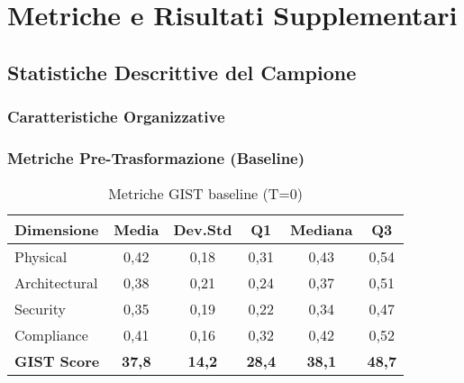 \chapter{Metriche e Risultati Supplementari}
\label{app:metriche}

\section{Statistiche Descrittive del Campione}

\subsection{Caratteristiche Organizzative}

\begin{table}[htbp]
\centering
\caption{Statistiche descrittive delle organizzazioni partecipanti}
\label{tab:stats_descrittive}
\end{table}

\subsection{Metriche Pre-Trasformazione (Baseline)}

\begin{table}[htbp]
\centering
\caption{Metriche GIST baseline (T=0)}
\label{tab:metriche_baseline}
\begin{tabular}{lccccc}
\toprule
\textbf{Dimensione} & \textbf{Media} & \textbf{Dev.Std} & \textbf{Q1} & \textbf{Mediana} & \textbf{Q3} \\
\midrule
Physical & 0,42 & 0,18 & 0,31 & 0,43 & 0,54 \\
Architectural & 0,38 & 0,21 & 0,24 & 0,37 & 0,51 \\
Security & 0,35 & 0,19 & 0,22 & 0,34 & 0,47 \\
Compliance & 0,41 & 0,16 & 0,32 & 0,42 & 0,52 \\
\midrule
\textbf{GIST Score} & \textbf{37,8} & \textbf{14,2} & \textbf{28,4} & \textbf{38,1} & \textbf{48,7} \\
\bottomrule
\end{tabular}
\end{table}

